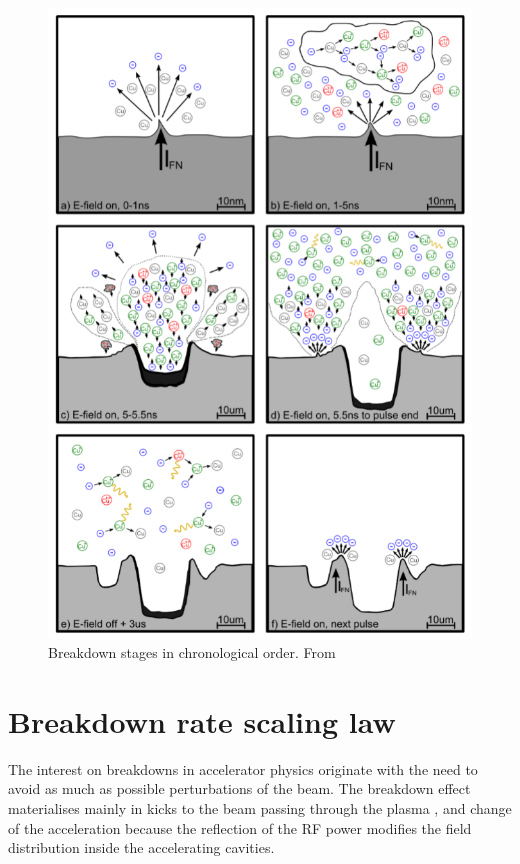 \begin{figure}[h]
\centering
\includegraphics[scale=0.4]{pictures/BD_process}
\caption{Breakdown stages in chronological order. From \cite{Kovermann:1330346}}
\label{BD_rocess}
\end{figure}


\section[Breakdown rate scaling law]{Breakdown rate scaling law}

The interest on breakdowns in accelerator physics originate with the need to avoid as much as possible perturbations of the beam. The breakdown effect materialises mainly in kicks to the beam passing through the plasma \cite{Palaia:1625826}, and change of the acceleration because the reflection of the RF power modifies the field distribution inside the accelerating cavities.

